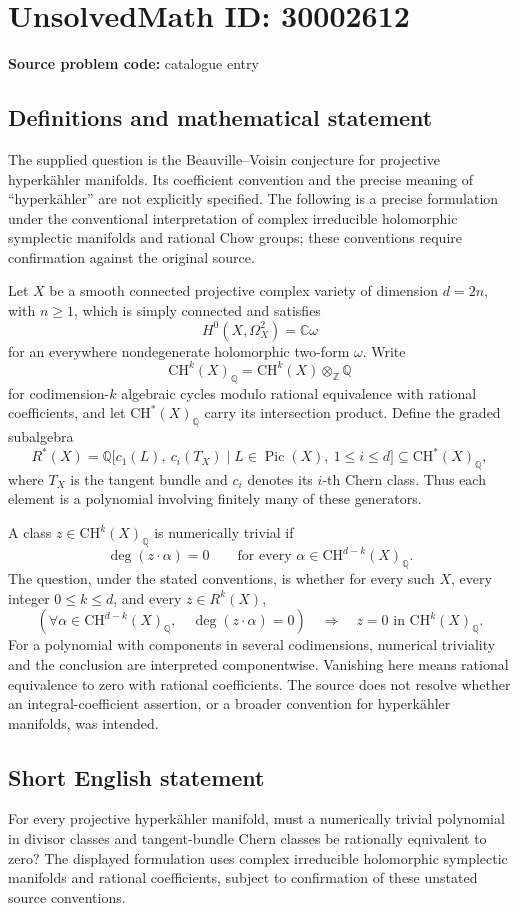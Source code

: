 \documentclass[11pt]{article}
\newcommand{\Z}{\mathbb{Z}}
\newcommand{\Q}{\mathbb{Q}}
\newcommand{\C}{\mathbb{C}}
\begin{document}
\section*{UnsolvedMath ID: 30002612}
\textbf{Source problem code:} catalogue entry
\subsection{Definitions and mathematical statement}
The supplied question is the Beauville--Voisin conjecture for projective hyperkähler manifolds. Its coefficient convention and the precise meaning of ``hyperkähler'' are not explicitly specified. The following is a precise formulation under the conventional interpretation of complex irreducible holomorphic symplectic manifolds and rational Chow groups; these conventions require confirmation against the original source.

Let \(X\) be a smooth connected projective complex variety of dimension \(d=2n\), with \(n\geq 1\), which is simply connected and satisfies
\[
H^0(X,\Omega_X^2)=\C\omega
\]
for an everywhere nondegenerate holomorphic two-form \(\omega\). Write
\[
\mathrm{CH}^k(X)_{\Q}=\mathrm{CH}^k(X)\otimes_{\Z}\Q
\]
for codimension-\(k\) algebraic cycles modulo rational equivalence with rational coefficients, and let \(\mathrm{CH}^*(X)_{\Q}\) carry its intersection product. Define the graded subalgebra
\[
R^*(X)=\Q\bigl[c_1(L),\ c_i(T_X)\mid L\in\operatorname{Pic}(X),\ 1\leq i\leq d\bigr]
\subseteq \mathrm{CH}^*(X)_{\Q},
\]
where \(T_X\) is the tangent bundle and \(c_i\) denotes its \(i\)-th Chern class. Thus each element is a polynomial involving finitely many of these generators.

A class \(z\in\mathrm{CH}^k(X)_{\Q}\) is numerically trivial if
\[
\deg(z\cdot\alpha)=0
\qquad\text{for every }\alpha\in\mathrm{CH}^{d-k}(X)_{\Q}.
\]
The question, under the stated conventions, is whether for every such \(X\), every integer \(0\leq k\leq d\), and every \(z\in R^k(X)\),
\[
\left(\forall\alpha\in\mathrm{CH}^{d-k}(X)_{\Q},\quad
\deg(z\cdot\alpha)=0\right)
\quad\Longrightarrow\quad
z=0\text{ in }\mathrm{CH}^k(X)_{\Q}.
\]
For a polynomial with components in several codimensions, numerical triviality and the conclusion are interpreted componentwise. Vanishing here means rational equivalence to zero with rational coefficients. The source does not resolve whether an integral-coefficient assertion, or a broader convention for hyperkähler manifolds, was intended.
\subsection{Short English statement}
For every projective hyperkähler manifold, must a numerically trivial polynomial in divisor classes and tangent-bundle Chern classes be rationally equivalent to zero? The displayed formulation uses complex irreducible holomorphic symplectic manifolds and rational coefficients, subject to confirmation of these unstated source conventions.
\end{document}
